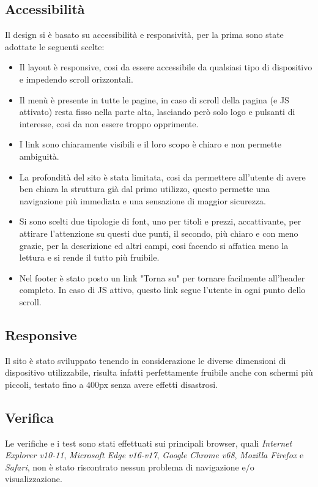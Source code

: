 \subsection{Accessibilità}
Il design si è basato su accessibilità e responsività, per la prima sono state adottate le seguenti scelte:
\begin{itemize}
	\item Il layout è responsive, cosi da essere accessibile da qualsiasi tipo di dispositivo e impedendo scroll orizzontali.
	\item Il menù è presente in tutte le pagine, in caso di scroll della pagina (e JS attivato) resta fisso nella parte alta, lasciando però solo logo e pulsanti di interesse, cosi da non essere troppo opprimente.
	\item I link sono chiaramente visibili e il loro scopo è chiaro e non permette ambiguità.
	\item La profondità del sito è stata limitata, cosi da permettere all'utente di avere ben chiara la struttura già dal primo utilizzo, questo permette una navigazione più immediata e una sensazione di maggior sicurezza.
	\item Si sono scelti due tipologie di font, uno per titoli e prezzi, accattivante, per attirare l'attenzione su questi due punti, il secondo, più chiaro e con meno grazie, per la descrizione ed altri campi, cosi facendo si affatica meno la lettura e si rende il tutto più fruibile.
	\item Nel footer è stato posto un link "Torna su" per tornare facilmente all'header completo. In caso di JS attivo, questo link segue l'utente in ogni punto dello scroll. 
\end{itemize}
\subsection{Responsive}

Il sito è stato sviluppato tenendo in considerazione le diverse dimensioni di dispositivo utilizzabile, risulta infatti perfettamente fruibile anche con schermi più piccoli, testato fino a 400px senza avere effetti disastrosi.

\subsection{Verifica}
Le verifiche e i test sono stati effettuati sui principali browser, quali \textit{Internet Explorer v10-11}, \textit{Microsoft Edge v16-v17},  \textit{Google Chrome v68},
\textit{Mozilla Firefox} e \textit{Safari}, non è stato riscontrato nessun problema di navigazione e/o visualizzazione.
